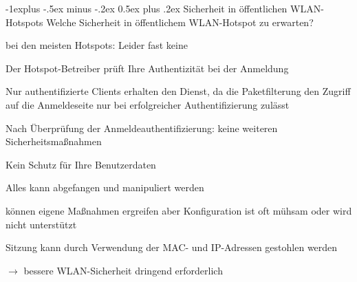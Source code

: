 \documentclass[a4paper]{article}
\makeatletter
\renewcommand{\subsection}{\@startsection{subsection}{2}{0mm}%
 {-1explus -.5ex minus -.2ex}%
 {0.5ex plus .2ex}%
 {\normalfont\normalsize\bfseries}}
\makeatother
\begin{document}
\begin{multicols}{3}
      \subsection{ Sicherheit in öffentlichen WLAN-Hotspots}
      Welche Sicherheit in öffentlichem WLAN-Hotspot zu erwarten?
      \begin{itemize*}
            \item bei den meisten Hotspots: Leider fast keine
            \item Der Hotspot-Betreiber prüft Ihre Authentizität bei der Anmeldung %
            \item Nur authentifizierte Clients erhalten den Dienst, da die Paketfilterung den Zugriff auf die Anmeldeseite nur bei erfolgreicher Authentifizierung zulässt
            \item Nach Überprüfung der Anmeldeauthentifizierung: keine weiteren Sicherheitsmaßnahmen
            \item Kein Schutz für Ihre Benutzerdaten
            \begin{itemize*}
                  \item Alles kann abgefangen und manipuliert werden
                  \item können eigene Maßnahmen ergreifen aber Konfiguration ist oft mühsam oder wird nicht unterstützt %
            \end{itemize*}
            \item Sitzung kann durch Verwendung der MAC- und IP-Adressen gestohlen werden
            \item[$\rightarrow$] bessere WLAN-Sicherheit dringend erforderlich
      \end{itemize*}


\end{multicols}
\end{document}
